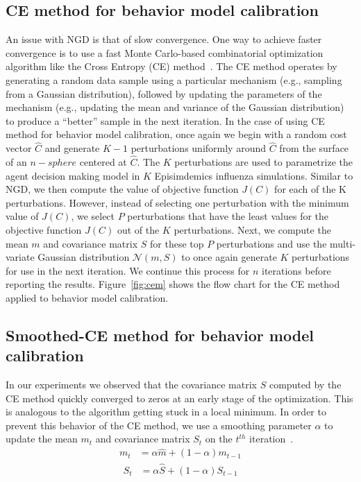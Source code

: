\documentclass[doublespace,draft]{VTthesis}
\begin{document}
    \subsection{CE method for behavior model calibration}
    An issue with NGD is that of slow convergence. One way to achieve faster convergence is to use a fast Monte Carlo-based combinatorial optimization algorithm like the Cross Entropy (CE) method~\cite{kroese2013cross,stulp2012path}. The CE method operates by generating a random data sample using a particular mechanism (e.g., sampling from a Gaussian distribution), followed by updating the parameters of the mechanism (e.g., updating the mean and variance of the Gaussian distribution) to produce a ``better'' sample in the next iteration. In the case of using CE method for behavior model calibration, once again we begin with a random cost vector $\hat{C}$ and generate $K-1$ perturbations uniformly around $\hat{C}$ from the surface of an $n-sphere$ centered at $\hat{C}$. The $K$ perturbations are used to parametrize the agent decision making model in $K$ Episimdemics influenza simulations. Similar to NGD, we then compute the value of objective function $J(C)$ for each of the K perturbations. However, instead of selecting one perturbation with the minimum value of $J(C)$, we select $P$ perturbations that have the least values for the objective function $J(C)$ out of the $K$ perturbations. Next, we compute the mean $m$ and covariance matrix $S$ for these top $P$ perturbations and use the multi-variate Gaussian distribution $\mathcal{N}(m,S)$ to once again generate $K$ perturbations for use in the next iteration. We continue this process for $n$ iterations before reporting the results. Figure~\ref{fig:cem} shows the flow chart for the CE method applied to behavior model calibration.
    
    \subsection{Smoothed-CE method for behavior model calibration}
    In our experiments we observed that the covariance matrix $S$ computed by the CE method quickly converged to zeros at an early stage of the optimization. This is analogous to the algorithm getting stuck in a local minimum. In order to prevent this behavior of the CE method, we use a smoothing parameter $\alpha$ to update the mean $m_t$ and covariance matrix $S_t$ on the $t^{th}$ iteration~\cite{mannor2003cross}.
    \begin{align}
        m_t &= \alpha  \hat{m} + (1-\alpha)  m_{t-1}
    		\label{eqn:smean}
    \end{align}
    \begin{align}
    		S_t &= \alpha  \hat{S} + (1-\alpha)  S_{t-1}
    		\label{eqn:scovmat}
    \end{align}
    
\end{document}
